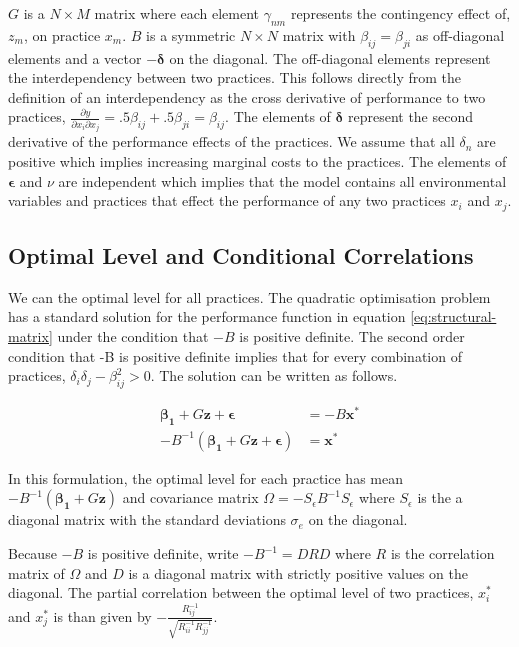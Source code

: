 \documentclass[12pt]{article}
\begin{document}
$G$ is a $N \times M$ matrix where each element $\gamma_{nm}$ represents the contingency effect of, $z_m$, on practice $x_m$. $B$ is a symmetric $N \times N$ matrix with $\beta_{ij} = \beta_{ji}$ as off-diagonal elements and a vector $-\mathbf{\delta}$ on the diagonal. The off-diagonal elements represent the interdependency between two practices. This follows directly from the definition of an interdependency as the cross derivative of performance to two practices, $\frac{\partial y}{\partial x_i \partial x_j} = .5 \beta_{ij} + .5 \beta_{ji} = \beta_{ij}$. The elements of $\mathbf{\delta}$ represent the second derivative of the performance effects of the practices. We assume that all $\delta_n$ are positive which implies increasing marginal costs to the practices. The elements of $\mathbf{\epsilon}$ and $\nu$ are independent which implies that the model contains all environmental variables and practices that effect the performance of any two practices $x_i$ and $x_j$. 
 
\subsection{Optimal Level and Conditional Correlations}

We can the optimal level for all practices. The quadratic optimisation problem has a standard solution for the performance function in equation \eqref{eq:structural-matrix} under the condition that $-B$ is positive definite. The second order condition that -B is positive definite implies that for every combination of practices, $\delta_i \delta_j - \beta_{ij}^2 > 0$. The solution can be written as follows.
 
\begin{equation} \label{eq:optimal-matrix}
\begin{aligned} 
    \mathbf{\beta_1} + G \mathbf{z} + \mathbf{\epsilon} & = -B \mathbf{x^*} \\
    - B^{-1} (\mathbf{\beta_1} +  G \mathbf{z} + \mathbf{\epsilon})  & = \mathbf{x^*}
\end{aligned}
\end{equation}
 
In this formulation, the optimal level for each practice has mean $-B^{-1} (\mathbf{\beta_1} + G \mathbf{z})$ and covariance matrix $\Omega = -S_{\epsilon} B^{-1} S_{\epsilon}$ where $S_{\epsilon}$ is the a diagonal matrix with the standard deviations $\sigma_e$ on the diagonal. 

Because $-B$ is positive definite, write $-B^{-1} = DRD$ where $R$ is the correlation matrix of $\Omega$ and $D$ is a diagonal matrix with strictly positive values on the diagonal. The partial correlation between the optimal level of two practices, $x^*_i$ and $x^*_j$ is than given by $-\frac{R^{-1}_{ij}}{\sqrt{R^{-1}_{ii} R^{-1}_{jj}}}$. 
\end{document}
